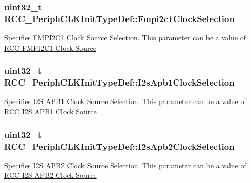 \subsubsection[{\texorpdfstring{Fmpi2c1\+Clock\+Selection}{Fmpi2c1ClockSelection}}]{\setlength{\rightskip}{0pt plus 5cm}uint32\+\_\+t R\+C\+C\+\_\+\+Periph\+C\+L\+K\+Init\+Type\+Def\+::\+Fmpi2c1\+Clock\+Selection}\hypertarget{struct_r_c_c___periph_c_l_k_init_type_def_ad5cccf5bf29ec78119677af6a0507848}{}\label{struct_r_c_c___periph_c_l_k_init_type_def_ad5cccf5bf29ec78119677af6a0507848}
Specifies F\+M\+P\+I2\+C1 Clock Source Selection. This parameter can be a value of \hyperlink{group___r_c_c_ex___f_m_p_i2_c1___clock___source}{R\+CC F\+M\+P\+I2\+C1 Clock Source} 
\subsubsection[{\texorpdfstring{I2s\+Apb1\+Clock\+Selection}{I2sApb1ClockSelection}}]{\setlength{\rightskip}{0pt plus 5cm}uint32\+\_\+t R\+C\+C\+\_\+\+Periph\+C\+L\+K\+Init\+Type\+Def\+::\+I2s\+Apb1\+Clock\+Selection}\hypertarget{struct_r_c_c___periph_c_l_k_init_type_def_aed6e10bc77b5bde090bb3fdba9c9fb54}{}\label{struct_r_c_c___periph_c_l_k_init_type_def_aed6e10bc77b5bde090bb3fdba9c9fb54}
Specifies I2S A\+P\+B1 Clock Source Selection. This parameter can be a value of \hyperlink{group___r_c_c_ex___i2_s_a_p_b1___clock___source}{R\+CC I2S A\+P\+B1 Clock Source} 
\subsubsection[{\texorpdfstring{I2s\+Apb2\+Clock\+Selection}{I2sApb2ClockSelection}}]{\setlength{\rightskip}{0pt plus 5cm}uint32\+\_\+t R\+C\+C\+\_\+\+Periph\+C\+L\+K\+Init\+Type\+Def\+::\+I2s\+Apb2\+Clock\+Selection}\hypertarget{struct_r_c_c___periph_c_l_k_init_type_def_a8e83b13202658abe7a60e0e55b767455}{}\label{struct_r_c_c___periph_c_l_k_init_type_def_a8e83b13202658abe7a60e0e55b767455}
Specifies I2S A\+P\+B2 Clock Source Selection. This parameter can be a value of \hyperlink{group___r_c_c_ex___i2_s_a_p_b2___clock___source}{R\+CC I2S A\+P\+B2 Clock Source} 
